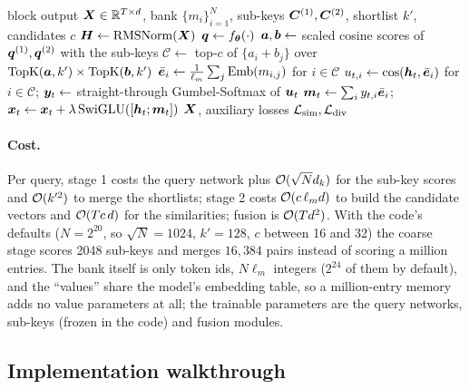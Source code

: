 \begin{algorithm}[t]
\caption{ExplicitLM memory layer (two-stage retrieval and fusion)}\label{alg:c10-explicit}
\begin{algorithmic}[1]
\Require block output $\bm{X} \in \mathbb{R}^{T\times d}$, bank $\{m_i\}_{i=1}^{N}$, sub-keys $\bm{C}^{(1)},\bm{C}^{(2)}$, shortlist $k'$, candidates $c$
\State $\bm{H} \gets \operatorname{RMSNorm}(\bm{X})$
\State $\bm{q} \gets f_{\bm{\theta}}(\cdot)$ 
\State $\bm{a}, \bm{b} \gets$ scaled cosine scores of $\bm{q}^{(1)}, \bm{q}^{(2)}$ with the sub-keys
\State $\mathcal{C} \gets$ top-$c$ of $\{a_i + b_j\}$ over $\operatorname{TopK}(\bm{a},k') \times \operatorname{TopK}(\bm{b},k')$ 
\State $\bar{\bm{e}}_i \gets \frac{1}{\ell_m}\sum_j \mathrm{Emb}(m_{i,j})$ for $i \in \mathcal{C}$ 
  \State $u_{t,i} \gets \cos(\bm{h}_t, \bar{\bm{e}}_i)$ for $i \in \mathcal{C}$;\; $\bm{y}_t \gets$ straight-through Gumbel-Softmax of $\bm{u}_t$
  \State $\bm{m}_t \gets \sum_i y_{t,i}\bar{\bm{e}}_i$;\; $\bm{x}_t \gets \bm{x}_t + \lambda\,\mathrm{SwiGLU}([\bm{h}_t;\bm{m}_t])$
\EndFor
\State \Return $\bm{X}$, auxiliary losses $\mathcal{L}_{\mathrm{sim}}, \mathcal{L}_{\mathrm{div}}$
\end{algorithmic}
\end{algorithm}

\paragraph{Cost.} Per query, stage 1 costs the query network plus $\mathcal{O}(\sqrt{N} d_k)$ for the
sub-key scores and $\mathcal{O}(k'^2)$ to merge the shortlists; stage 2 costs $\mathcal{O}(c\,\ell_m d)$ to build
the candidate vectors and $\mathcal{O}(T c\, d)$ for the similarities; fusion is $\mathcal{O}(T d^2)$. With the
code's defaults ($N = 2^{20}$, so $\sqrt{N} = 1024$, $k' = 128$, $c$ between 16 and 32) the coarse
stage scores 2048 sub-keys and merges $16{,}384$ pairs instead of scoring a million entries. The
bank itself is only token ids, $N \ell_m$ integers ($2^{24}$ of them by default), and the
``values'' share the model's embedding table, so a million-entry memory adds no value parameters
at all; the trainable parameters are the query networks, sub-keys (frozen in the code) and fusion
modules.

\subsection{Implementation walkthrough}\label{sec:c10-explicit-code}

